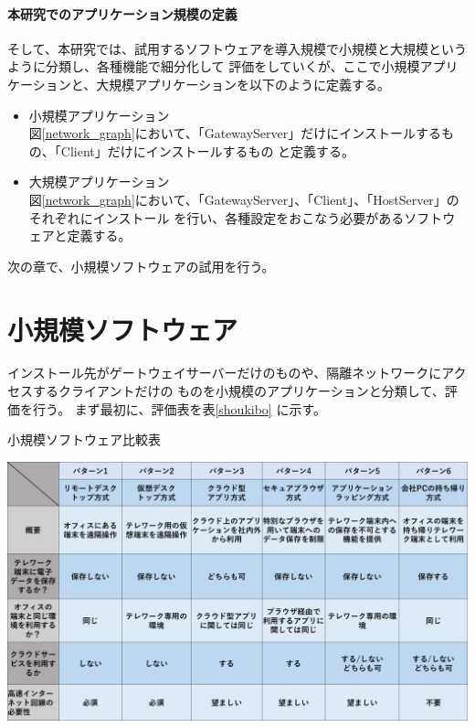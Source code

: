 \documentclass[11pt,a4j,titlepage]{jreport}
\begin{document}
\subsubsection{本研究でのアプリケーション規模の定義}
そして、本研究では、試用するソフトウェアを導入規模で小規模と大規模というように分類し、各種機能で細分化して
評価をしていくが、ここで小規模アプリケーションと、大規模アプリケーションを以下のように定義する。


\begin{itemize}
    \setlength{\parskip}{0.05cm} %
    \setlength{\itemsep}{0.05cm}
    \item 小規模アプリケーション\mbox{}\\
    図\ref{network_graph}において、「GatewayServer」だけにインストールするもの、「Client」だけにインストールするもの
    と定義する。
    \item 大規模アプリケーション\mbox{}\\
    図\ref{network_graph}において、「GatewayServer」、「Client」、「HostServer」のそれぞれにインストール
    を行い、各種設定をおこなう必要があるソフトウェアと定義する。


\end{itemize}

次の章で、小規模ソフトウェアの試用を行う。

\chapter{小規模ソフトウェア}
インストール先がゲートウェイサーバーだけのものや、隔離ネットワークにアクセスするクライアントだけの
ものを小規模のアプリケーションと分類して、評価を行う。
まず最初に、評価表を表\ref{shoukibo} に示す。

\begin{table}[tbp]
    \centering
    \caption{小規模ソフトウェア比較表}
    \includegraphics*[width=1.0\textwidth,page=4]{graphs/telework_list.pdf}
    \label{shoukibo}
\end{table}
\end{document}
